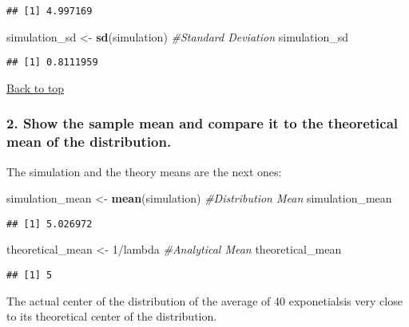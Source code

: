 \documentclass[]{article}
\newenvironment{Shaded}{\begin{snugshade}}{\end{snugshade}}
\newcommand{\KeywordTok}[1]{\textcolor[rgb]{0.13,0.29,0.53}{\textbf{{#1}}}}
\newcommand{\DecValTok}[1]{\textcolor[rgb]{0.00,0.00,0.81}{{#1}}}
\newcommand{\StringTok}[1]{\textcolor[rgb]{0.31,0.60,0.02}{{#1}}}
\newcommand{\CommentTok}[1]{\textcolor[rgb]{0.56,0.35,0.01}{\textit{{#1}}}}
\newcommand{\NormalTok}[1]{{#1}}
\begin{document}
\begin{verbatim}
## [1] 4.997169
\end{verbatim}

\begin{Shaded}
\begin{Highlighting}[]
\NormalTok{simulation_sd     <-}\StringTok{ }\KeywordTok{sd}\NormalTok{(simulation) }\CommentTok{#Standard Deviation}
\NormalTok{simulation_sd }
\end{Highlighting}
\end{Shaded}

\begin{verbatim}
## [1] 0.8111959
\end{verbatim}

\protect\hyperlink{top}{Back to top}

\subsubsection{2. Show the sample mean and compare it to the theoretical
mean of the
distribution.}\label{show-the-sample-mean-and-compare-it-to-the-theoretical-mean-of-the-distribution.}

The simulation and the theory means are the next ones:

\begin{Shaded}
\begin{Highlighting}[]
\NormalTok{simulation_mean  <-}\StringTok{ }\KeywordTok{mean}\NormalTok{(simulation) }\CommentTok{#Distribution Mean}
\NormalTok{simulation_mean}
\end{Highlighting}
\end{Shaded}

\begin{verbatim}
## [1] 5.026972
\end{verbatim}

\begin{Shaded}
\begin{Highlighting}[]
\NormalTok{theoretical_mean  <-}\StringTok{ }\DecValTok{1}\NormalTok{/lambda }\CommentTok{#Analytical Mean}
\NormalTok{theoretical_mean}
\end{Highlighting}
\end{Shaded}

\begin{verbatim}
## [1] 5
\end{verbatim}

The actual center of the distribution of the average of 40 exponetialsis
very close to its theoretical center of the distribution.
\end{document}

